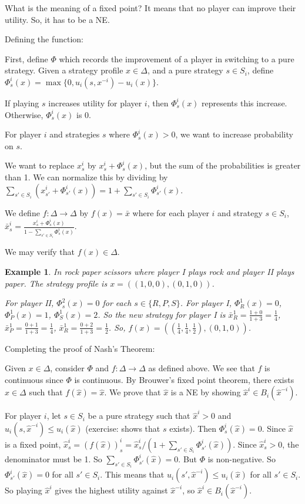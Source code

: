\documentclass[twoside]{article}
\newtheorem{protoexample}[prototheorem]{Example}
\newenvironment{example}
{\colorlet{shadecolor}{red!15}\begin{shaded}\begin{protoexample}\normalfont}
		{\end{protoexample}\end{shaded}}
\begin{document}
What is the meaning of a fixed point? It means that no player can improve their utility. So, it has to be a NE. 

Defining the function: 

First, define $\Phi$ which records the improvement of a player in switching to a pure strategy. Given a strategy profile $x \in \Delta$, and a pure strategy $s \in S_i$, define $\Phi_s^i(x) = \max\{0, u_i(s, x^{-i}) - u_i(x)\}$. 

If playing $s$ increases utility for player $i$, then $\Phi_s^i(x)$ represents this increase. Otherwise, $\Phi_s^i(x)$ is 0. 

For player $i$ and strategies $s$ where $\Phi_s^i(x) > 0$, we want to increase probability on $s$. 

We want to replace $x_s^i$ by $x_s^i + \Phi_s^i(x)$, but the sum of the probabilities is greater than 1. We can normalize this by dividing by $\sum_{s' \in S_i}(x_{s'}^i + \Phi_{s'}^i(x)) = 1 + \sum_{s' \in S_i}\Phi_{s'}^i(x)$. 

We define $f: \Delta \rightarrow \Delta$ by $f(x) = \bar{x}$ where for each player $i$ and strategy $s \in S_i$, $\bar{x}_s^i = \frac{x_s^i + \Phi_s^i(x)}{1 - \sum_{s' \in S_i}\Phi_s^i(x)}$. 

We may verify that $f(x) \in \Delta$. 

\begin{example}
	In rock paper scissors where player I plays rock and player II plays paper. The strategy profile is $x = ((1, 0 , 0), (0 , 1, 0))$. 
		
	For player II, $\Phi_s^2(x) = 0$ for each $s \in \{R, P, S\}$. For player I, $\Phi_R^1(x) = 0$, $\Phi_P^1(x) = 1$, $\Phi_S^1(x) = 2$. So the new strategy for player I is $\bar{x}_R^1 = \frac{1+0}{1+3} = \frac{1}{4}$, $\bar{x}_P^1 = \frac{0+1}{1+3} = \frac{1}{4}$, $\bar{x}_R^1 = \frac{0+2}{1+3} = \frac{1}{2}$. So, $f(x) = ((\frac{1}{4}, \frac{1}{4}, \frac{1}{2}), (0, 1, 0))$. 
\end{example}

Completing the proof of Nash's Theorem: 

Given $x \in \Delta$, consider $\Phi$ and $f: \Delta \rightarrow \Delta$ as defined above. We see that $f$ is continuous since $\Phi$ is continuous. By Brouwer's fixed point theorem, there exists $\hat{x} \in \Delta$ such that $f(\hat{x}) = \hat{x}$. We prove that $\hat{x}$ is a NE by showing $\hat{x}^i \in B_i(\hat{x}^{-i})$. 

For player $i$, let $s \in S_i$ be a pure strategy such that $\hat{x}^i > 0$ and $u_i(s, \hat{x}^{-i}) \leq u_i(\hat{x})$ (exercise: shows that $s$ exists). Then $\Phi_s^i(\hat{x}) = 0$. Since $\hat{x}$ is a fixed point, $\hat{x}_s^i = (f(\hat{x}))_s^i = \hat{x}_s^i / (1 + \sum_{s' \in S_i} \Phi_{s'}^i(\hat{x}))$. Since $\hat{x}_s^i > 0$, the denominator must be 1. So $\sum_{s' \in S_i} \Phi_{s'}^i(\hat{x}) = 0$. But $\Phi$ is non-negative. So $\Phi_{s'}^i(\hat{x}) = 0$ for all $s' \in S_i$. This means that $u_i(s', \hat{x}^{-i}) \leq u_i(\hat{x})$ for all $s' \in S_i$. So playing $\hat{x}^i$ gives the highest utility against $\hat{x}^{-i}$, so $\hat{x}^i \in B_i(\hat{x}^{-i})$. 
\end{document}
